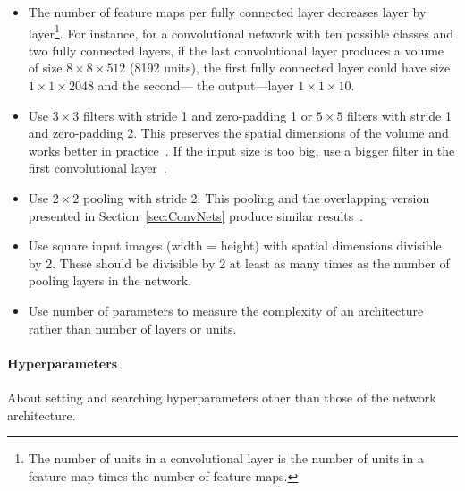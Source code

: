 \begin{itemize}
	\item The number of feature maps per fully connected layer decreases layer by layer\footnote{The number of units in a convolutional layer is the number of units in a feature map times the number of feature maps.}. For instance, for a convolutional network with ten possible classes and two fully connected layers, if the last convolutional layer produces a volume of size $8 \times 8 \times 512$ (8192 units), the first fully connected layer could have size $1 \times 1 \times 2048$ and the second--- the output---layer $1\times 1\times 10$.

	\item Use $3\times 3$ filters with stride 1 and zero-padding 1 or $5 \times 5$ filters with stride 1 and zero-padding 2. This preserves the spatial dimensions of the volume and works better in practice~\cite{Springenberg2014}. If the input size is too big, use a bigger filter in the first convolutional layer~\cite{Karpathy2015}.
	
	\item Use $2\times2$ pooling with stride 2. This pooling and the overlapping version presented in Section~\ref{sec:ConvNets} produce similar results~\cite{Krizhevsky2012}.
	\item Use square input images (width = height) with spatial dimensions divisible by 2. These should be divisible by 2 at least as many times as the number of pooling layers in the network.

	\item Use number of parameters to measure the complexity of an architecture rather than number of layers or units.
\end{itemize}



\paragraph{Hyperparameters} About setting and searching hyperparameters other than those of the network architecture.


